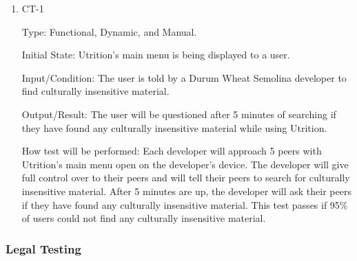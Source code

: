 \documentclass[12pt, titlepage]{article}
\begin{document}
	\begin{enumerate}
		\item{CT-1} 
		
		Type: Functional, Dynamic, and Manual.
		
		Initial State: Utrition’s main menu is being displayed to a user.
		
		Input/Condition: The user is told by a Durum Wheat Semolina developer to find culturally insensitive material.
		
		Output/Result: The user will be questioned after 5 minutes of searching if they have found any culturally insensitive material while using Utrition.
		
		How test will be performed: Each developer will approach 5 peers with Utrition’s main menu open on the developer’s device. The developer will give full control over to their peers and will tell their peers to search for culturally insensitive material. After 5 minutes are up, the developer will ask their peers if they have found any culturally insensitive material. This test passes if 95\% of users could not find any culturally insensitive material.
		
	\end{enumerate}
	
	\subsubsection{Legal Testing}
	
	
\end{document}
